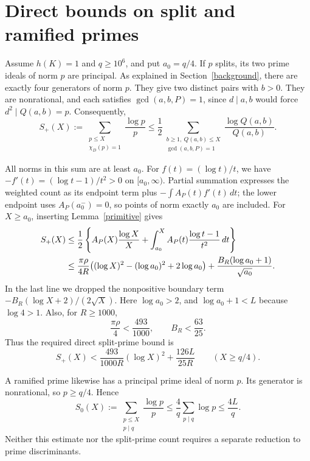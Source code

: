 \documentclass[11pt]{article}
\begin{document}
\section{Direct bounds on split and ramified primes}

Assume \(h(K)=1\) and \(q\ge10^6\), and put \(a_0=q/4\).
If \(p\) splits, its two prime ideals of norm \(p\) are principal.
As explained in Section~\ref{background}, there are exactly four generators
of norm \(p\). They give two distinct pairs with \(b>0\).
They are nonrational, and each satisfies \(\gcd(a,b,P)=1\), since
\(d\mid a,b\) would force \(d^2\mid Q(a,b)=p\).
Consequently,
\begin{equation}\label{split-count}
 S_+(X):=\sum_{\substack{p\le X\\\chi_D(p)=1}}\frac{\log p}{p}
 \le\frac12\sum_{\substack{b\ge1,\ Q(a,b)\le X\\\gcd(a,b,P)=1}}
                        \frac{\log Q(a,b)}{Q(a,b)}.
\end{equation}

All norms in this sum are at least \(a_0\).
For \(f(t)=(\log t)/t\), we have
\(-f'(t)=(\log t-1)/t^2>0\) on \([a_0,\infty)\).
Partial summation expresses the weighted count as its endpoint term
plus \(-\int A_P(t)f'(t)\,dt\); the lower endpoint uses
\(A_P(a_0^-)=0\), so points of norm exactly \(a_0\) are included.
For \(X\ge a_0\), inserting Lemma~\ref{primitive} gives
\begin{align}
 S_+(X)
 &\le\frac12\left\{
 A_P(X)\frac{\log X}{X}
 +\int_{a_0}^X A_P(t)\frac{\log t-1}{t^2}\,dt\right\} \notag\\
 &\le\frac{\pi\rho}{4R}
       \bigl((\log X)^2-(\log a_0)^2+2\log a_0\bigr)
   +\frac{B_R(\log a_0+1)}{\sqrt{a_0}}.\label{split-precise}
\end{align}
In the last line we dropped the nonpositive boundary term
\(-B_R(\log X+2)/(2\sqrt X)\).
Here \(\log a_0>2\), and \(\log a_0+1<L\) because \(\log4>1\).
Also, for \(R\ge1000\),
\[
 \frac{\pi\rho}{4}<\frac{493}{1000},\qquad B_R<\frac{63}{25}.
\]
Thus the required direct split-prime bound is
\begin{equation}\label{split-final}
 S_+(X)<\frac{493}{1000R}(\log X)^2+\frac{126L}{25R}
             \qquad(X\ge q/4).
\end{equation}

A ramified prime likewise has a principal prime ideal of norm \(p\).
Its generator is nonrational, so \(p\ge q/4\). Hence
\begin{equation}\label{ramified}
 S_0(X):=\sum_{\substack{p\le X\\p\mid q}}\frac{\log p}{p}
 \le\frac4q\sum_{p\mid q}\log p\le\frac{4L}{q}.
\end{equation}
Neither this estimate nor the split-prime count requires a separate
reduction to prime discriminants.
\end{document}
